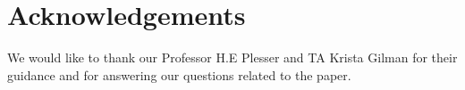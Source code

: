 \documentclass[sigconf, nonacm, natbib, screen, balance=False]{acmart}
\begin{document}
\section{Acknowledgements}\label{sec:acknowledgements}
We would like to thank our Professor H.E Plesser and TA Krista Gilman for their guidance and for answering our questions related to the paper. 



\end{document}
